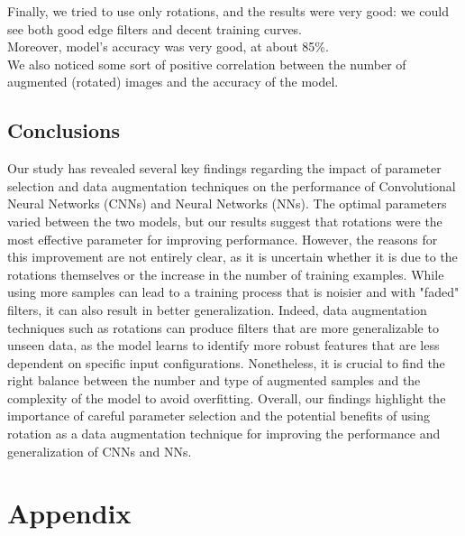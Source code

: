 \documentclass{report}
\begin{document}
Finally, we tried to use only rotations, and the results were very good: we could see both good edge filters and decent training curves.\\
Moreover, model's accuracy was very good, at about 85\%.\\
We also noticed some sort of positive correlation between the number of augmented (rotated) images and the accuracy of the model.\\


\pagebreak
\chapter{Conclusions}

Our study has revealed several key findings regarding the impact of parameter selection and data augmentation 
techniques on the performance of Convolutional Neural Networks (CNNs) and Neural Networks (NNs). The optimal 
parameters varied between the two models, but our results suggest that rotations were the most effective 
parameter for improving performance. However, the reasons for this improvement are not entirely clear, as it is 
uncertain whether it is due to the rotations themselves or the increase in the number of training examples. 
While using more samples can lead to a training process that is noisier and with "faded" filters, it can also 
result in better generalization. Indeed, data augmentation techniques such as rotations can produce filters that 
are more generalizable to unseen data, as the model learns to identify more robust features that are less 
dependent on specific input configurations. Nonetheless, it is crucial to find the right balance between the 
number and type of augmented samples and the complexity of the model to avoid overfitting. Overall, our findings 
highlight the importance of careful parameter selection and the potential benefits of using rotation as a data 
augmentation technique for improving the performance and generalization of CNNs and NNs.

\pagebreak

\part{Appendix}
\appendix
\end{document}
